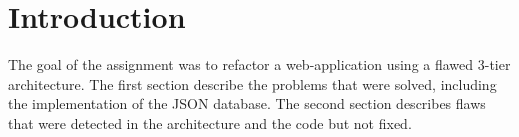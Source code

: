 \section{Introduction}

The goal of the assignment was to refactor a web-application using a flawed
3-tier architecture. The first section describe the problems that were solved,
including the implementation of the JSON database. The second section describes
flaws that were detected in the architecture and the code but not fixed.
\newpage
